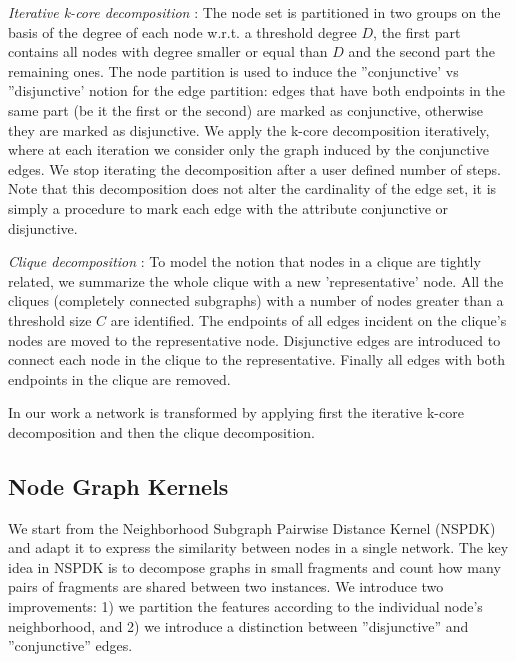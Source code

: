 \documentclass[review]{elsarticle}
\begin{document}
\textit{Iterative k-core decomposition} \cite{alvarez2005k}: The node set is partitioned in two groups on the basis of the degree of each node w.r.t. a threshold degree $D$, the first part contains all nodes with degree smaller or equal than $D$ and the second part the remaining ones. The node partition is used to induce the ''conjunctive' vs ''disjunctive' notion for the edge partition: edges that have both endpoints in the same part (be it the first or the second) are marked as conjunctive, otherwise they are marked as disjunctive. We apply the k-core decomposition iteratively, where at each iteration we consider only the graph induced by the conjunctive edges. We stop iterating the decomposition after a user defined number of steps. Note that this decomposition does not alter the cardinality of the edge set, it is simply a procedure to mark each edge with the attribute conjunctive or disjunctive.  



\textit{Clique decomposition} \cite{tarjan1985decomposition}: To model the notion that nodes in a clique are tightly related, we summarize the whole clique with a new 'representative' node. All the cliques (completely connected subgraphs) with a number of nodes greater than a threshold size $C$ are identified. The endpoints of all edges incident on the clique's nodes are moved to the representative node. Disjunctive edges are introduced to connect each node in the clique to the representative. Finally all edges with both endpoints in the clique are removed.

In our work a network is transformed by applying first the iterative k-core decomposition and then the clique decomposition.

\subsection{Node Graph Kernels} 
We start from the Neighborhood Subgraph Pairwise Distance Kernel (NSPDK) \cite{costa2010fast} and adapt it to express the similarity between nodes in a single network. The key idea in NSPDK is to decompose graphs in small fragments and count how many pairs of fragments are shared between two instances. We introduce two improvements: 1) we partition the features according to the individual node's neighborhood, and 2) we introduce a  distinction between ''disjunctive'' and ''conjunctive'' edges.
\end{document}
